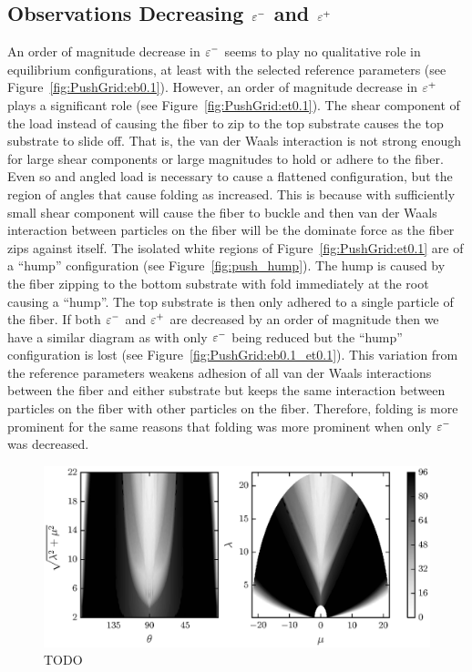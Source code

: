 \subsection{Observations Decreasing $\varepsilon^-$ and $\varepsilon^+$} \label{subsection:push:eps}

An order of magnitude decrease in $\varepsilon^-$ seems to play no qualitative role in equilibrium configurations, at least with the selected reference parameters (see Figure~\ref{fig:PushGrid:eb0.1}). However, an order of magnitude decrease in $\varepsilon^+$ plays a significant role (see Figure~\ref{fig:PushGrid:et0.1}). The shear component of the load instead of causing the fiber to zip to the top substrate causes the top substrate to slide off. That is, the van der Waals interaction is not strong enough for large shear components or large magnitudes to hold or adhere to the fiber. Even so and angled load is necessary to cause a flattened configuration, but the region of angles that cause folding as increased. This is because with sufficiently small shear component will cause the fiber to buckle and then van der Waals interaction between particles on the fiber will be the dominate force as the fiber zips against itself. The isolated white regions of Figure~\ref{fig:PushGrid:et0.1} are of a ``hump'' configuration (see Figure~\ref{fig:push_hump}). The hump is caused by the fiber zipping to the bottom substrate with fold immediately at the root causing a ``hump''. The top substrate is then only adhered to a single particle of the fiber. If both $\varepsilon^-$ and $\varepsilon^+$ are decreased by an order of magnitude then we have a similar diagram as with only $\varepsilon^-$ being reduced but the ``hump'' configuration is lost (see Figure~\ref{fig:PushGrid:eb0.1_et0.1}). This variation from the reference parameters weakens adhesion of all van der Waals interactions between the fiber and either substrate but keeps the same interaction between particles on the fiber with other particles on the fiber. Therefore, folding is more prominent for the same reasons that folding was more prominent when only $\varepsilon^-$ was decreased.
	
	\begin{figure}[t]
		\begin{center}
			\includegraphics{./fig/ch3/push/g1000/grid.eps}
		\end{center}		
		\caption{ TODO
		\label{fig:PushGrid:g1000}}
	\end{figure}	

